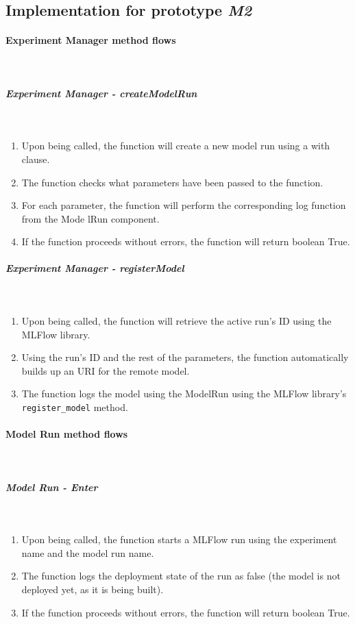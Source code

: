 \subsection{Implementation for prototype \emph{M2}}

\paragraph{Experiment Manager method flows} \mbox{}\\

\subparagraph{Experiment Manager - createModelRun} \mbox{}\\

\begin{enumerate}
    \item Upon being called, the function will create a new model run using a with clause.

    \item The function checks what parameters have been passed to the function.

    \item For each parameter, the function will perform the corresponding log function from the Mode lRun component.

    \item If the function proceeds without errors, the function will return boolean True.
\end{enumerate}

\subparagraph{Experiment Manager - registerModel} \mbox{}\\

\begin{enumerate}
    \item Upon being called, the function will retrieve the active run's ID using the MLFlow library.
    \item Using the run's ID and the rest of the parameters, the function automatically builds up an URI for the remote model.
    \item The function logs the model using the ModelRun using the MLFlow library's \texttt{register\_model} method.
\end{enumerate}

\paragraph{Model Run method flows} \mbox{}\\

\subparagraph{Model Run - Enter} \mbox{}\\
\begin{enumerate}
    \item Upon being called, the function starts a MLFlow run using the experiment name and the model run name.
    \item The function logs the deployment state of the run as false (the model is not deployed yet, as it is being built).
    \item If the function proceeds without errors, the function will return boolean True.
\end{enumerate}

